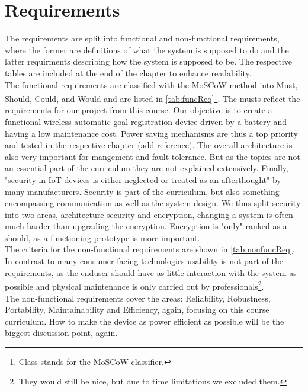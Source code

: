 \section{Requirements}
The requirements are split into functional and non-functional requirements, where the former are definitions of what the system is supposed to do and the latter requirments describing how the system is supposed to be. The respective tables are included at the end of the chapter to enhance readability.\\
The functional requirements are classified with the MoSCoW method into Must, Should, Could, and Would and are listed in \cref{tab:funcReq}\footnote{Class stands for the MoSCoW classifier.}. The musts reflect the requirements for our project from this course. Our objective is to create a functional wireless automatic goal registration device driven by a battery and having a low maintenance cost. Power saving mechanisms are thus a top priority and tested in the respective chapter (add reference). The overall architecture is also very important for mangement and fault tolerance. But as the topics are not an essential part of the curriculum they are not explained extensively. Finally, "security in IoT devices is either neglected or treated as an afterthought"\cite{wurm2016securityAftertought} by many manufacturers. Security is part of the curriculum, but also something encompassing communication as well as the system design. We thus split security into two areas, architecture security and encryption, changing a system is often much harder than upgrading the encryption. Encryption is "only" ranked as a should, as a functioning prototype is more important.\\
The criteria for the non-functional requirements are shown in \cref{tab:nonfuncReq}.
In contrast to many consumer facing technologies usability is not part of the requirements, as the enduser should have as little interaction with the system as possible and physical maintenance is only carried out by professionals\footnote{They would still be nice, but due to time limitations we excluded them.}.\\ 
The non-functional requirements cover the areas: Reliability, Robustness, Portability, Maintainability and Efficiency, again, focusing on this course curriculum. How to make the device as power efficient as possible will be the biggest discussion point, again.

